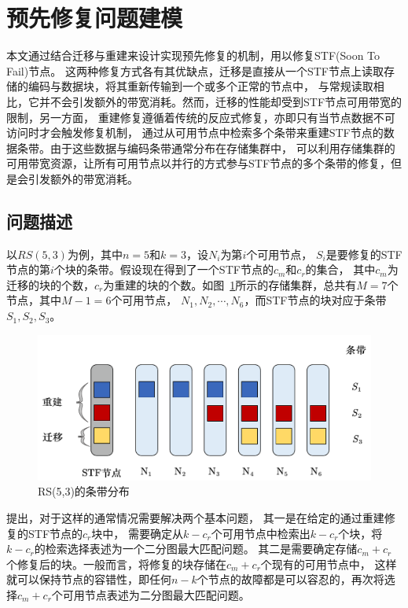 \section{预先修复问题建模}
本文通过结合迁移与重建来设计实现预先修复的机制，用以修复STF(Soon To Fail)\cite{shen2019fast}节点。
这两种修复方式各有其优缺点，迁移是直接从一个STF节点上读取存储的编码与数据块，将其重新传输到一个或多个正常的节点中，
与常规读取相比，它并不会引发额外的带宽消耗。然而，迁移的性能却受到STF节点可用带宽的限制，另一方面，
重建修复遵循着传统的反应式修复，亦即只有当节点数据不可访问时才会触发修复机制，
通过从可用节点中检索多个条带来重建STF节点的数据条带。由于这些数据与编码条带通常分布在存储集群中，
可以利用存储集群的可用带宽资源，让所有可用节点以并行的方式参与STF节点的多个条带的修复，但是会引发额外的带宽消耗。

\subsection{问题描述}

以$RS(5,3)$为例，其中$n=5$和$k=3$，设$N_i$为第$i$个可用节点，
$S_i$是要修复的STF节点的第$i$个块的条带。假设现在得到了一个STF节点的$c_m$和$c_r$的集合，
其中$c_m$为迁移的块的个数，$c_r$为重建的块的个数。如图~\ref{fig:3.2}所示的存储集群，总共有$M=7$个节点，其中$M-1=6$个可用节点，
$N_1,N_2,\cdots,N_6$，而STF节点的块对应于条带$S_1,S_2,S_3$。


\begin{figure}[htbp]
	\centering
	\includegraphics [scale=0.5]{figures/3.2.pdf}
	\caption{RS(5,3)的条带分布}
	\label{fig:3.2}
\end{figure}

\citet{shen2019fast}提出，对于这样的通常情况需要解决两个基本问题，
其一是在给定的通过重建修复的STF节点的$c_r$块中，
需要确定从$k-c_r$个可用节点中检索出$k-c_r$个块，将$k-c_r$的检索选择表述为一个二分图最大匹配问题。
其二是需要确定存储$c_m+c_r$个修复后的块。一般而言，将修复的块存储在$c_m+c_r$个现有的可用节点中，
这样就可以保持节点的容错性，即任何$n-k$个节点的故障都是可以容忍的，再次将选择$c_m+c_r$个可用节点表述为二分图最大匹配问题。

